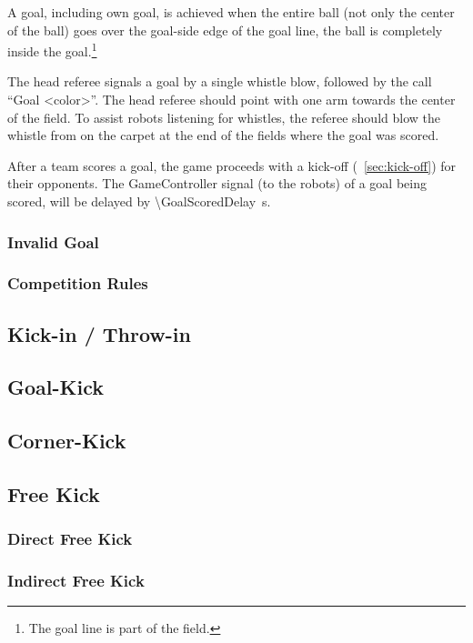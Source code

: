 A goal, including own goal, is achieved when the entire ball (not only the center of the ball) goes over the goal-side edge of the goal line, \ie the ball is completely inside the goal.\footnote{
  The goal line is part of the field.
}

The head referee signals a goal by a single whistle blow, followed by the call ``Goal \textless color\textgreater''.
The head referee should point with one arm towards the center of the field.
To assist robots listening for whistles, the referee should blow the whistle from on the carpet at the end of the fields where the goal was scored.

After a team scores a goal, the game proceeds with a kick-off (\cf~\cref{sec:kick-off}) for their opponents.
The GameController signal (to the robots) of a goal being scored, will be delayed by \qty{\GoalScoredDelay}{\second}.

\subsubsection{Invalid Goal}
\subsubsection{Competition Rules}

\subsection{Kick-in / Throw-in}

\subsection{Goal-Kick}

\subsection{Corner-Kick}

\subsection{Free Kick}
\subsubsection{Direct Free Kick}
\subsubsection{Indirect Free Kick}
